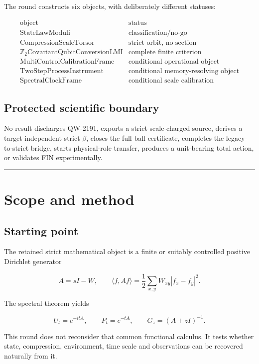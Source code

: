 \documentclass[11pt,a4paper,openany]{report}
\begin{document}
The round constructs six objects, with deliberately different statuses:

\[
\begin{array}{c|c}
\text{object}&\text{status}\\
\hline
\text{StateLawModuli}&\text{classification/no-go}\\
\text{CompressionScaleTorsor}&\text{strict orbit, no section}\\
\mathbb Z_2\text{CovariantQubitConversionLMI}&\text{complete finite criterion}\\
\text{MultiControlCalibrationFrame}&\text{conditional operational object}\\
\text{TwoStepProcessInstrument}&\text{conditional memory-resolving object}\\
\text{SpectralClockFrame}&\text{conditional scale calibration}
\end{array}
\]

\section{Protected scientific boundary}

No result discharges QW-2191, exports a strict scale-charged source, derives a target-independent strict \(\beta\), closes the full ball certificate, completes the legacy-to-strict bridge, starts physical-role transfer, produces a unit-bearing total action, or validates FIN experimentally.

\par\medskip\hrule\medskip

\chapter{Scope and method}

\section{Starting point}

The retained strict mathematical object is a finite or suitably controlled positive Dirichlet generator

\[
A=sI-W,\qquad
\langle f,Af\rangle
=\frac12\sum_{x,y}W_{xy}|f_x-f_y|^2.
\]

The spectral theorem yields

\[
U_t=e^{-itA},\qquad
P_t=e^{-tA},\qquad
G_z=(A+zI)^{-1}.
\]

This round does not reconsider that common functional calculus. It tests whether state, compression, environment, time scale and observations can be recovered naturally from it.
\end{document}
